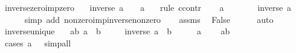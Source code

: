 \begin{isabellebody}
\isamarkupfalse%
%
\endisatagproof
{\isafoldproof}%
%
\isadelimproof
\isanewline
%
\endisadelimproof
\isanewline
{}\isamarkupfalse%
\ inverse{\isacharunderscore}{\kern0pt}zero{\isacharunderscore}{\kern0pt}imp{\isacharunderscore}{\kern0pt}zero{\isacharcolon}{\kern0pt}\isanewline
\ \ \ {\isachardoublequoteopen}inverse\ a\ {\isacharequal}{\kern0pt}\ {}{\isachardoublequoteclose}\ \ {\isachardoublequoteopen}a\ {\isacharequal}{\kern0pt}\ {}{\isachardoublequoteclose}\isanewline
%
\isadelimproof
%
\endisadelimproof
%
\isatagproof
{}\isamarkupfalse%
\ {\isacharparenleft}{\kern0pt}rule\ ccontr{\isacharparenright}{\kern0pt}\isanewline
\ \ \isamarkupfalse%
\ {\isachardoublequoteopen}a\ {\isasymnoteq}\ {}{\isachardoublequoteclose}\isanewline
\ \ \isamarkupfalse%
\ \isamarkupfalse%
\ {\isachardoublequoteopen}inverse\ a\ {\isasymnoteq}\ {}{\isachardoublequoteclose}\isanewline
\ \ \ \ \isamarkupfalse%
\ {\isacharparenleft}{\kern0pt}simp\ add{\isacharcolon}{\kern0pt}\ nonzero{\isacharunderscore}{\kern0pt}imp{\isacharunderscore}{\kern0pt}inverse{\isacharunderscore}{\kern0pt}nonzero{\isacharparenright}{\kern0pt}\isanewline
\ \ \isamarkupfalse%
\ assms\ \isamarkupfalse%
\ False\isanewline
\ \ \ \ \isamarkupfalse%
\ auto\isanewline
{}\isamarkupfalse%
%
\endisatagproof
{\isafoldproof}%
%
\isadelimproof
\isanewline
%
\endisadelimproof
\isanewline
{}\isamarkupfalse%
\ inverse{\isacharunderscore}{\kern0pt}unique{\isacharcolon}{\kern0pt}\isanewline
\ \ \ ab{\isacharcolon}{\kern0pt}\ {\isachardoublequoteopen}a\ {\isacharasterisk}{\kern0pt}\ b\ {\isacharequal}{\kern0pt}\ {}{\isachardoublequoteclose}\isanewline
\ \ \ {\isachardoublequoteopen}inverse\ a\ {\isacharequal}{\kern0pt}\ b{\isachardoublequoteclose}\isanewline
%
\isadelimproof
%
\endisadelimproof
%
\isatagproof
{}\isamarkupfalse%
\ {\isacharminus}{\kern0pt}\isanewline
\ \ \isamarkupfalse%
\ {\isachardoublequoteopen}a\ {\isasymnoteq}\ {}{\isachardoublequoteclose}\ \isamarkupfalse%
\ ab\ \isamarkupfalse%
\ {\isacharparenleft}{\kern0pt}cases\ {\isachardoublequoteopen}a\ {\isacharequal}{\kern0pt}\ {}{\isachardoublequoteclose}{\isacharparenright}{\kern0pt}\ simp{\isacharunderscore}{\kern0pt}all\isanewline
\ \ \isamarkupfalse%

\end{isabellebody}
